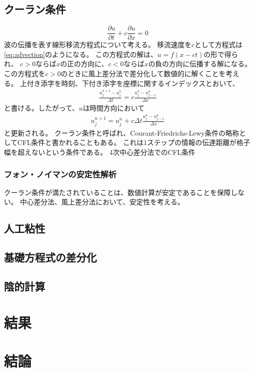 \documentclass{jsarticle}
\newcommand{\pder}[2][]{\frac{\partial#1}{\partial#2}}
\begin{document}
\subsection{クーラン条件}
\begin{equation}
    \pder[u]{t} + c\pder[u]{x} = 0\label{eq:advection}
\end{equation}
波の伝播を表す線形移流方程式について考える。
移流速度を$c$として方程式は\eqref{eq:advection}のようになる。
この方程式の解は、$u = f(x -ct)$の形で得られ、
$c>0$ならば$x$の正の方向に、$c<0$ならば$x$の負の方向に伝播する解になる。
この方程式を$c>0$のときに風上差分法で差分化して数値的に解くことを考える。
上付き添字を時刻、下付き添字を座標に関するインデックスとおいて、
\begin{align}
    \frac{u^{n+1}_j - u^{n}_j}{\Delta t} = c \frac{u^n_{j} - u^n_{j-1}}{\Delta x}
\end{align}
と書ける。したがって、$u$は時間方向において
\begin{align}
    u^{n+1}_j  =  u^{n}_j+ c \Delta t\frac{u^n_{j} - u^n_{j-1}}{\Delta x}
\end{align}
と更新される。
クーラン条件と呼ばれ、Courant-Friedrichs-Lewy条件の略称としてCFL条件と書かれることもある。
これは$1$ステップの情報の伝達距離が格子幅を超えないという条件である。%
4次中心差分法でのCFL条件
\subsubsection{フォン・ノイマンの安定性解析}
クーラン条件が満たされていることは、数値計算が安定であることを保障しない。
中心差分法、風上差分法において、安定性を考える。
\subsection{人工粘性}
\subsection{基礎方程式の差分化}
\subsection{陰的計算}
\section{結果}
\section{結論}


\end{document}
